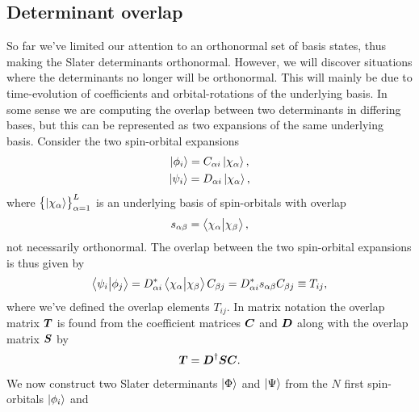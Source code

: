         \subsection{Determinant overlap}
            So far we've limited our attention to an orthonormal set of basis
            states, thus making the Slater determinants orthonormal.
            However, we will discover situations where the determinants no
            longer will be orthonormal.
            This will mainly be due to time-evolution of coefficients and
            orbital-rotations of the underlying basis.
            In some sense we are computing the overlap between two determinants
            in differing bases, but this can be represented as two expansions of
            the same underlying basis.
            Consider the two spin-orbital expansions
            \begin{gather}
                \ket{\phi_i} = C_{\alpha i}\ket{\chi_{\alpha}}, \\
                \ket{\psi_i} = D_{\alpha i}\ket{\chi_{\alpha}},
            \end{gather}
            where $\left\{ \ket{\chi_{\alpha}} \right\}_{\alpha = 1}^{L}$ is an underlying
            basis of spin-orbitals with overlap
            \begin{align}
                s_{\alpha\beta}
                = \braket{\chi_{\alpha}}{\chi_{\beta}},
            \end{align}
            not necessarily orthonormal.
            The overlap between the two spin-orbital expansions is thus given by
            \begin{align}
                \braket{\psi_i}{\phi_j}
                = D^{*}_{\alpha i}
                \braket{\chi_{\alpha}}{\chi_{\beta}}
                C_{\beta j}
                = D^{*}_{\alpha i}
                s_{\alpha\beta}
                C_{\beta j}
                \equiv
                T_{ij},
            \end{align}
            where we've defined the overlap elements $T_{ij}$.
            In matrix notation the overlap matrix $\boldsymbol{T}$ is found from the
            coefficient matrices $\boldsymbol{C}$ and $\boldsymbol{D}$ along with the overlap
            matrix $\boldsymbol{S}$ by
            \begin{align}
                \boldsymbol{T} = \boldsymbol{D}^{\dagger}\boldsymbol{S}\boldsymbol{C}.
            \end{align}
            We now construct two Slater determinants $\ket{\Phi}$ and
            $\ket{\Psi}$ from the $N$ first spin-orbitals $\ket{\phi_i}$ and
